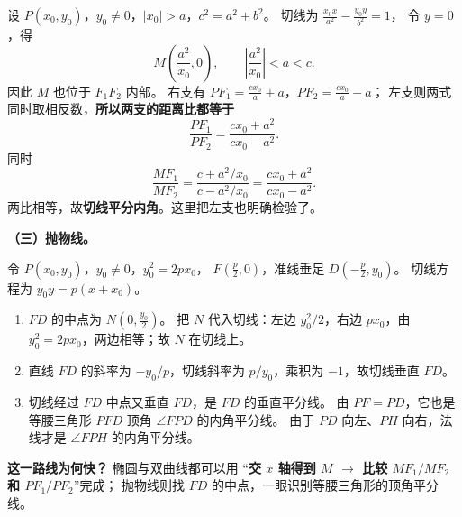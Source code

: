 \begin{proofbox}
设 $P(x_0,y_0)$，$y_0\ne0$，$|x_0|>a$，$c^2=a^2+b^2$。
切线为 $\tfrac{x_0x}{a^2}-\tfrac{y_0y}{b^2}=1$，
令 $y=0$，得
\[
M\left(\frac{a^2}{x_0},0\right),\qquad
\left|\frac{a^2}{x_0}\right|<a<c.
\]
因此 $M$ 也位于 $F_1F_2$ 内部。
右支有 $PF_1=\tfrac{cx_0}{a}+a$，$PF_2=\tfrac{cx_0}{a}-a$；
左支则两式同时取相反数，\textbf{所以两支的距离比都等于}
\[
\frac{PF_1}{PF_2}=\frac{cx_0+a^2}{cx_0-a^2}.
\]
同时
\[
\frac{MF_1}{MF_2}
=\frac{c+a^2/x_0}{c-a^2/x_0}
=\frac{cx_0+a^2}{cx_0-a^2}.
\]
两比相等，故\textbf{切线平分内角}。这里把左支也明确检验了。

\par\medskip\begin{minipage}{\linewidth}
\textbf{（三）抛物线。}
\begin{center}\end{center}
\end{minipage}\par

令 $P(x_0,y_0)$，$y_0\ne0$，$y_0^2=2px_0$，
$F(\tfrac p2,0)$，准线垂足 $D(-\tfrac p2,y_0)$。
切线方程为 $y_0y=p(x+x_0)$。
\begin{enumerate}
\item $FD$ 的中点为 $N(0,\tfrac{y_0}{2})$。
把 $N$ 代入切线：左边 $y_0^2/2$，右边 $px_0$，由 $y_0^2=2px_0$，两边相等；故 $N$ 在切线上。
\item 直线 $FD$ 的斜率为 $-y_0/p$，切线斜率为 $p/y_0$，乘积为 $-1$，故切线垂直 $FD$。
\item 切线经过 $FD$ 中点又垂直 $FD$，是 $FD$ 的垂直平分线。
由 $PF=PD$，它也是等腰三角形 $PFD$ 顶角 $\angle FPD$ 的内角平分线。
由于 $PD$ 向左、$PH$ 向右，法线才是 $\angle FPH$ 的内角平分线。
\end{enumerate}

\textbf{这一路线为何快？} 椭圆与双曲线都可以用
“\textbf{交 $x$ 轴得到 $M$ $\rightarrow$ 比较 $MF_1/MF_2$ 和 $PF_1/PF_2$}”完成；
抛物线则找 $FD$ 的中点，一眼识别等腰三角形的顶角平分线。

\medskip\noindent
\end{proofbox}
\clearpage
